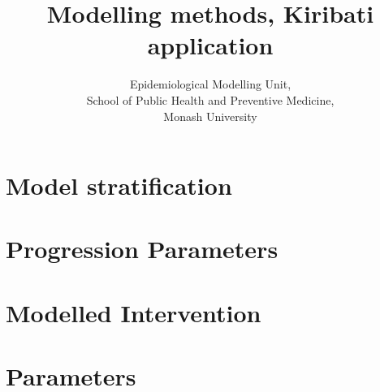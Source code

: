 \documentclass{article}
\author{
    Epidemiological Modelling Unit,
    \\ School of Public Health and Preventive Medicine,
    \\ Monash University
}
\title{Modelling methods, Kiribati application}
\begin{document}
\maketitle



\section{Model stratification}




\section{Progression Parameters}

\section{Modelled Intervention}

\section{Parameters}

\newpage
\printbibliography
\end{document}
